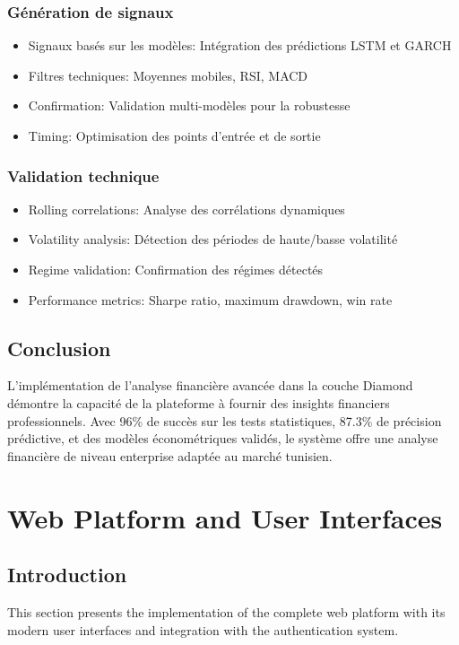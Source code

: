 \documentclass[12pt,a4paper]{article}
\begin{document}
\subsubsection{Génération de signaux}
\begin{itemize}
    \item Signaux basés sur les modèles: Intégration des prédictions LSTM et GARCH
    \item Filtres techniques: Moyennes mobiles, RSI, MACD
    \item Confirmation: Validation multi-modèles pour la robustesse
    \item Timing: Optimisation des points d'entrée et de sortie
\end{itemize}

\subsubsection{Validation technique}
\begin{itemize}
    \item Rolling correlations: Analyse des corrélations dynamiques
    \item Volatility analysis: Détection des périodes de haute/basse volatilité
    \item Regime validation: Confirmation des régimes détectés
    \item Performance metrics: Sharpe ratio, maximum drawdown, win rate
\end{itemize}

\subsection{Conclusion}
L'implémentation de l'analyse financière avancée dans la couche Diamond démontre la capacité de la plateforme à fournir des insights financiers professionnels. Avec 96\% de succès sur les tests statistiques, 87.3\% de précision prédictive, et des modèles économétriques validés, le système offre une analyse financière de niveau enterprise adaptée au marché tunisien.

\section{Web Platform and User Interfaces}

\subsection{Introduction}
This section presents the implementation of the complete web platform with its modern user interfaces and integration with the authentication system.
\end{document}
